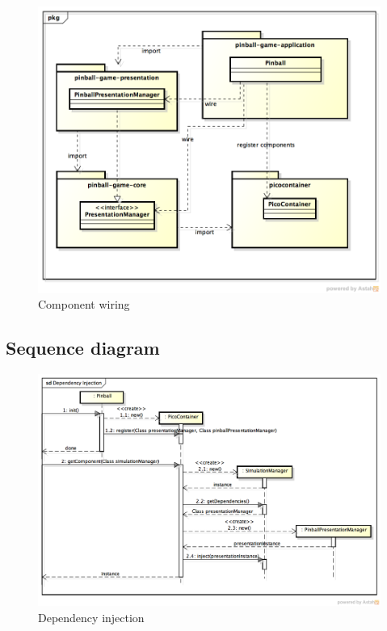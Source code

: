 \documentclass[fontsize=12pt,
               paper=a4,
               twoside=false,
               parskip=half,
               ]{scrartcl}
\begin{document}
\begin{figure}[h!]
	\centering
	\includegraphics[width=15.5cm]{./img/dependency-injection2.png}
	\caption[Component wiring]{Component wiring}
	\label{fig:dependency_injection2}
\end{figure}


\subsection{Sequence diagram}

\begin{figure}[h!]
	\centering
	\includegraphics[width=15.5cm]{./img/dependency-injection-sd.png}
	\caption[Dependency injection]{Dependency injection}
	\label{fig:dependency_injection3}
\end{figure}
\end{document}
